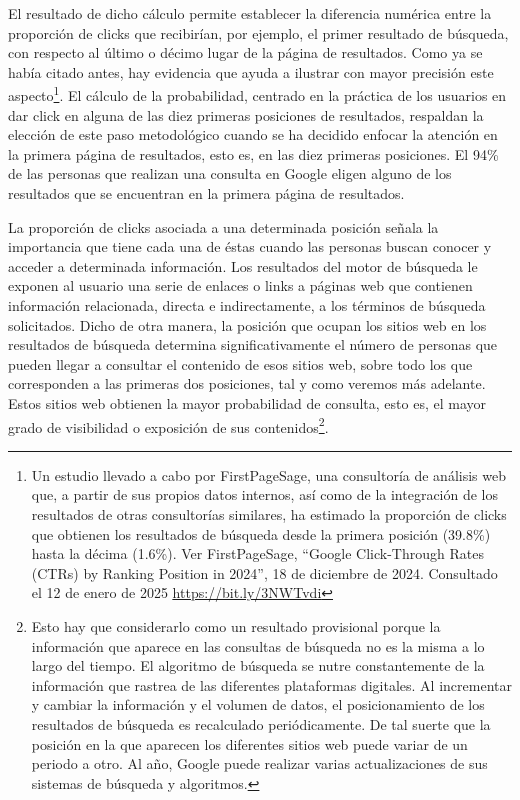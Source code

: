 \documentclass[
  spanish,
  11pt,
  a4paper,
]{scrbook}
\begin{document}
El resultado de dicho cálculo permite establecer la diferencia numérica
entre la proporción de clicks que recibirían, por ejemplo, el primer
resultado de búsqueda, con respecto al último o décimo lugar de la
página de resultados. Como ya se había citado antes, hay evidencia que
ayuda a ilustrar con mayor precisión este aspecto\footnote{Un estudio
  llevado a cabo por FirstPageSage, una consultoría de análisis web que,
  a partir de sus propios datos internos, así como de la integración de
  los resultados de otras consultorías similares, ha estimado la
  proporción de clicks que obtienen los resultados de búsqueda desde la
  primera posición (39.8\%) hasta la décima (1.6\%). Ver FirstPageSage,
  ``Google Click-Through Rates (CTRs) by Ranking Position in 2024'', 18
  de diciembre de 2024. Consultado el 12 de enero de 2025
  \href{https://bit.ly/3NWTvdi}{\ul{https://bit.ly/3NWTvdi}}}. El
cálculo de la probabilidad, centrado en la práctica de los usuarios en
dar click en alguna de las diez primeras posiciones de resultados,
respaldan la elección de este paso metodológico cuando se ha decidido
enfocar la atención en la primera página de resultados, esto es, en las
diez primeras posiciones. El 94\% de las personas que realizan una
consulta en Google eligen alguno de los resultados que se encuentran en
la primera página de resultados.

La proporción de clicks asociada a una determinada posición señala la
importancia que tiene cada una de éstas cuando las personas buscan
conocer y acceder a determinada información. Los resultados del motor de
búsqueda le exponen al usuario una serie de enlaces o links a páginas
web que contienen información relacionada, directa e indirectamente, a
los términos de búsqueda solicitados. Dicho de otra manera, la posición
que ocupan los sitios web en los resultados de búsqueda determina
significativamente el número de personas que pueden llegar a consultar
el contenido de esos sitios web, sobre todo los que corresponden a las
primeras dos posiciones, tal y como veremos más adelante. Estos sitios
web obtienen la mayor probabilidad de consulta, esto es, el mayor grado
de visibilidad o exposición de sus contenidos\footnote{Esto hay que
  considerarlo como un resultado provisional porque la información que
  aparece en las consultas de búsqueda no es la misma a lo largo del
  tiempo. El algoritmo de búsqueda se nutre constantemente de la
  información que rastrea de las diferentes plataformas digitales. Al
  incrementar y cambiar la información y el volumen de datos, el
  posicionamiento de los resultados de búsqueda es recalculado
  periódicamente. De tal suerte que la posición en la que aparecen los
  diferentes sitios web puede variar de un periodo a otro. Al año,
  Google puede realizar varias actualizaciones de sus sistemas de
  búsqueda y algoritmos.}.
\end{document}
